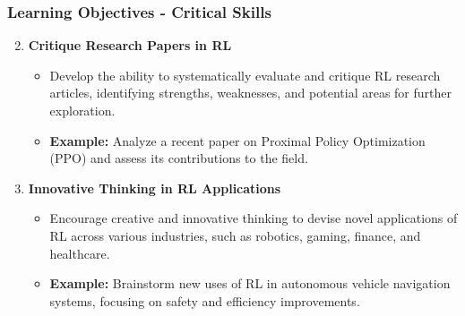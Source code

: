\documentclass{beamer}
\begin{document}
\begin{frame}[fragile]
    \frametitle{Learning Objectives - Critical Skills}
    \begin{enumerate}
        \setcounter{enumi}{1}
        \item \textbf{Critique Research Papers in RL}
        \begin{itemize}
            \item Develop the ability to systematically evaluate and critique RL research articles, identifying strengths, weaknesses, and potential areas for further exploration.
            \item \textbf{Example:} Analyze a recent paper on Proximal Policy Optimization (PPO) and assess its contributions to the field.
        \end{itemize}

        \item \textbf{Innovative Thinking in RL Applications}
        \begin{itemize}
            \item Encourage creative and innovative thinking to devise novel applications of RL across various industries, such as robotics, gaming, finance, and healthcare.
            \item \textbf{Example:} Brainstorm new uses of RL in autonomous vehicle navigation systems, focusing on safety and efficiency improvements.
        \end{itemize}
    \end{enumerate}
\end{frame}
\end{document}
